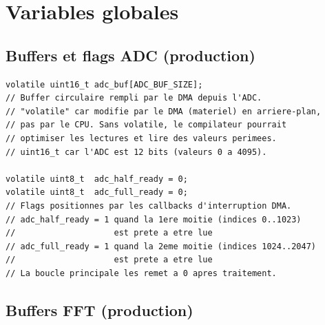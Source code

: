 \documentclass[a4paper,11pt]{article}
\begin{document}
\section{Variables globales}

\subsection{Buffers et flags ADC (production)}

\begin{lstlisting}[style=cstyle,caption={D\'eclarations des buffers ADC et flags DMA}]
volatile uint16_t adc_buf[ADC_BUF_SIZE];
// Buffer circulaire rempli par le DMA depuis l'ADC.
// "volatile" car modifie par le DMA (materiel) en arriere-plan,
// pas par le CPU. Sans volatile, le compilateur pourrait
// optimiser les lectures et lire des valeurs perimees.
// uint16_t car l'ADC est 12 bits (valeurs 0 a 4095).

volatile uint8_t  adc_half_ready = 0;
volatile uint8_t  adc_full_ready = 0;
// Flags positionnes par les callbacks d'interruption DMA.
// adc_half_ready = 1 quand la 1ere moitie (indices 0..1023)
//                    est prete a etre lue
// adc_full_ready = 1 quand la 2eme moitie (indices 1024..2047)
//                    est prete a etre lue
// La boucle principale les remet a 0 apres traitement.
\end{lstlisting}

\subsection{Buffers FFT (production)}
\end{document}
